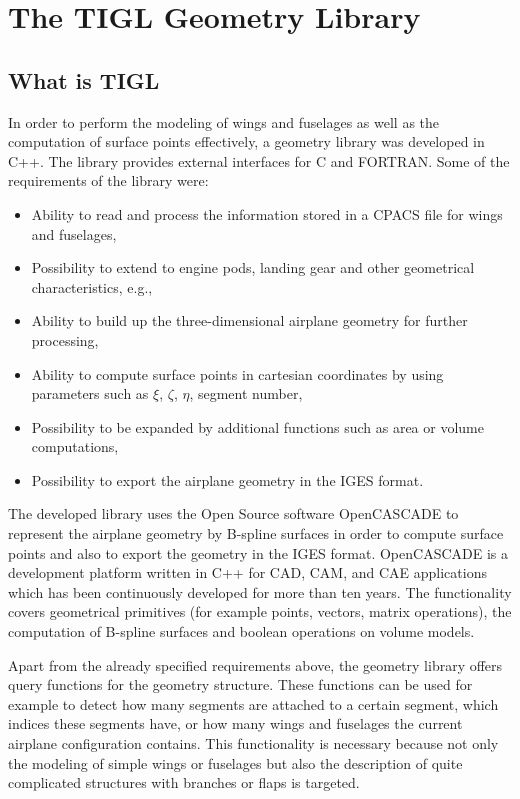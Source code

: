 
\chapter{The TIGL Geometry Library}\label{tiglIntro}

\section{What is TIGL}\label{tiglIntro}
In order to perform the modeling of wings and fuselages as well as the computation of surface points effectively, a
geometry library was developed in C++. The library provides external interfaces
for C and FORTRAN. Some of the requirements of the library were:

\begin{itemize}
 \item Ability to read and process the information stored in a CPACS file for
 wings and fuselages,
 \item Possibility to extend to engine pods, landing gear and other
 geometrical characteristics, e.g.,
 \item Ability to build up the three-dimensional airplane geometry for further
 processing,
 \item Ability to compute surface points in cartesian coordinates by using
 parameters such as $\xi$, $\zeta$, $\eta$, segment number,
 \item Possibility to be expanded by additional functions such as area or volume
 computations,
 \item Possibility to export the airplane geometry in the IGES format.
\end{itemize}


The developed library uses the Open Source software OpenCASCADE to represent the airplane geometry by B-spline surfaces
in order to compute surface points and also to export the geometry in the IGES format.
OpenCASCADE is a development platform written in C++ for CAD, CAM, and CAE
applications which has been continuously developed for more than ten years. 
The functionality covers geometrical primitives (for example points,
vectors, matrix operations), the computation of B-spline surfaces and boolean operations on volume models.

Apart from the already specified requirements above, the geometry library 
offers query functions for the geometry structure. These functions can be used
for example to detect how many segments are attached to a certain segment,
which indices these segments have, or how many wings and fuselages the current
airplane configuration contains. This functionality is necessary because not
only the modeling of simple wings or fuselages but also the description of quite complicated
structures with branches or flaps is targeted.


